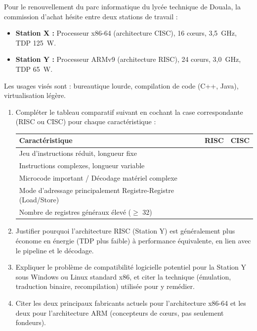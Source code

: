 \documentclass[11pt]{article}
\begin{document}
\begin{exercice}
Pour le renouvellement du parc informatique du lycée technique de Douala, la commission d'achat hésite entre deux stations de travail :
\begin{itemize}
    \item \textbf{Station X :} Processeur x86-64 (architecture CISC), 16 cœurs, 3,5~GHz, TDP 125~W.
    \item \textbf{Station Y :} Processeur ARMv9 (architecture RISC), 24 cœurs, 3,0~GHz, TDP 65~W.
\end{itemize}
Les usages visés sont : bureautique lourde, compilation de code (C++, Java), virtualisation légère.
\begin{enumerate}
    \item Compléter le tableau comparatif suivant en cochant la case correspondante (RISC ou CISC) pour chaque caractéristique :
    \begin{center}
    \begin{tabular}{|l|c|c|}
    \hline
    \textbf{Caractéristique} & \textbf{RISC} & \textbf{CISC} \\ \hline
    Jeu d'instructions réduit, longueur fixe & & \\ \hline
    Instructions complexes, longueur variable & & \\ \hline
    Microcode important / Décodage matériel complexe & & \\ \hline
    Mode d'adressage principalement Registre-Registre (Load/Store) & & \\ \hline
    Nombre de registres généraux élevé ($\ge$ 32) & & \\ \hline
    \end{tabular}
    \end{center}
    \item Justifier pourquoi l'architecture RISC (Station Y) est généralement plus économe en énergie (TDP plus faible) à performance équivalente, en lien avec le pipeline et le décodage.
    \item Expliquer le problème de compatibilité logicielle potentiel pour la Station Y sous Windows ou Linux standard x86, et citer la technique (émulation, traduction binaire, recompilation) utilisée pour y remédier.
    \item Citer les deux principaux fabricants actuels pour l'architecture x86-64 et les deux pour l'architecture ARM (concepteurs de cœurs, pas seulement fondeurs).
\end{enumerate}
\end{exercice}
\end{document}
